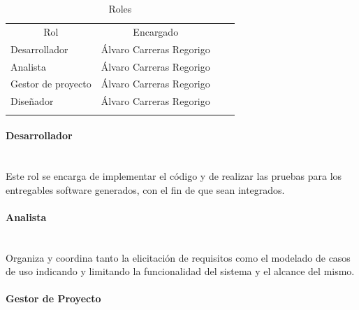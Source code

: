 \documentclass[twoside]{report}
\begin{document}
\begin{table}[H]
\begin{tabular}{llll}
\cline{1-2}
\multicolumn{1}{|c|}{Rol} & \multicolumn{1}{c|}{Encargado} &  &  \\ \cline{1-2}
\multicolumn{1}{|l|}{Desarrollador}                                      & \multicolumn{1}{l|}{Álvaro Carreras Regorigo}                                          &  &  \\ \cline{1-2}
\multicolumn{1}{|l|}{Analista}                                           & \multicolumn{1}{l|}{Álvaro Carreras Regorigo}                                          &  &  \\ \cline{1-2}
\multicolumn{1}{|l|}{Gestor de proyecto}                                 & \multicolumn{1}{l|}{Álvaro Carreras Regorigo}                                          &  &  \\ \cline{1-2}
\multicolumn{1}{|l|}{Diseñador}                                          & \multicolumn{1}{l|}{Álvaro Carreras Regorigo}                                                         &  &  \\ \cline{1-2}
                                                                         &                                                                               &  & 
\end{tabular}
\centering
\caption{Roles}
\end{table}
\vspace{0.5cm}

\paragraph{Desarrollador}\mbox{}\\

Este rol se encarga de implementar el código y de realizar las pruebas para los entregables software generados, con el fin de que sean integrados.

\paragraph{Analista}\mbox{}\\

Organiza y coordina tanto la elicitación de requisitos como el modelado de casos de uso indicando y limitando la funcionalidad del sistema y el alcance del mismo.

\paragraph{Gestor de Proyecto}\mbox{}\\
\end{document}
